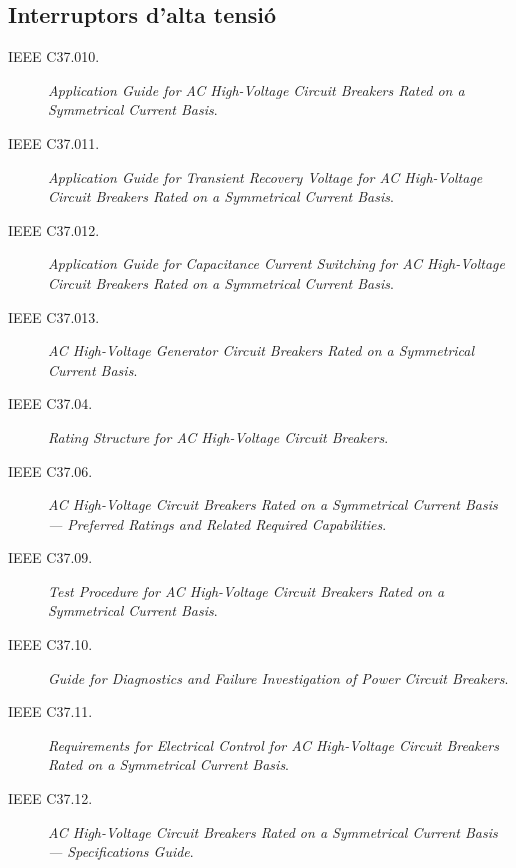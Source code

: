 \subsection*{Interruptors d'alta tensió}
\begin{description}
	\item [\hspace{5mm}IEEE C37.010.] \textit{Application Guide for AC High-Voltage Circuit Breakers Rated on a Symmetrical Current Basis}.
	\item [\hspace{5mm}IEEE C37.011.] \textit{Application Guide for Transient Recovery Voltage for AC High-Voltage Circuit Breakers Rated on a Symmetrical Current Basis}.
	\item [\hspace{5mm}IEEE C37.012.] \textit{Application Guide for Capacitance Current Switching for AC High-Voltage Circuit Breakers Rated on a Symmetrical Current Basis}.
	\item [\hspace{5mm}IEEE C37.013.] \textit{AC High-Voltage Generator Circuit Breakers Rated on a Symmetrical Current Basis}.
	\item [\hspace{5mm}IEEE C37.04.] \textit{Rating Structure for AC High-Voltage Circuit Breakers}.
	\item [\hspace{5mm}IEEE C37.06.] \textit{AC High-Voltage Circuit Breakers Rated on a Symmetrical Current Basis --- Preferred Ratings and Related Required Capabilities}.
	\item [\hspace{5mm}IEEE C37.09.] \textit{Test Procedure for AC High-Voltage Circuit Breakers Rated on a Symmetrical Current Basis}.
	\item [\hspace{5mm}IEEE C37.10.] \textit{Guide for Diagnostics and Failure Investigation of Power Circuit Breakers}.
	\item [\hspace{5mm}IEEE C37.11.] \textit{Requirements for Electrical Control for AC High-Voltage Circuit Breakers Rated on a Symmetrical Current Basis}.
	\item [\hspace{5mm}IEEE C37.12.] \textit{AC High-Voltage Circuit Breakers Rated on a Symmetrical Current Basis --- Specifications Guide}.
\end{description}


